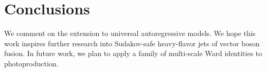 \section{Conclusions}\label{sec:conclusions}

We comment on the extension to universal autoregressive models. We hope
this work inspires further research into Sudakov-safe heavy-flavor jets
of vector boson fusion. In future work, we plan to apply a family of
multi-scale Ward identities to photoproduction.


